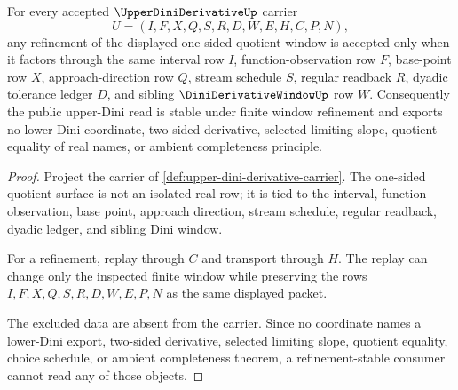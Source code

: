 \begin{theorem}
\label{thm:upper-dini-derivative-window-stability}
For every accepted $\UpperDiniDerivativeUp$ carrier
$$
U=(I,F,X,Q,S,R,D,W,E,H,C,P,N),
$$
any refinement of the displayed one-sided quotient window is accepted only when it factors through the same interval row $I$, function-observation row $F$, base-point row $X$, approach-direction row $Q$, stream schedule $S$, regular readback $R$, dyadic tolerance ledger $D$, and sibling $\DiniDerivativeWindowUp$ row $W$. Consequently the public upper-Dini read is stable under finite window refinement and exports no lower-Dini coordinate, two-sided derivative, selected limiting slope, quotient equality of real names, or ambient completeness principle.
\end{theorem}
\begin{proof}
Project the carrier of \autoref{def:upper-dini-derivative-carrier}. The one-sided quotient surface is not an isolated real row; it is tied to the interval, function observation, base point, approach direction, stream schedule, regular readback, dyadic ledger, and sibling Dini window.

For a refinement, replay through $C$ and transport through $H$. The replay can change only the inspected finite window while preserving the rows $I,F,X,Q,S,R,D,W,E,P,N$ as the same displayed packet.

The excluded data are absent from the carrier. Since no coordinate names a lower-Dini export, two-sided derivative, selected limiting slope, quotient equality, choice schedule, or ambient completeness theorem, a refinement-stable consumer cannot read any of those objects.
\end{proof}

